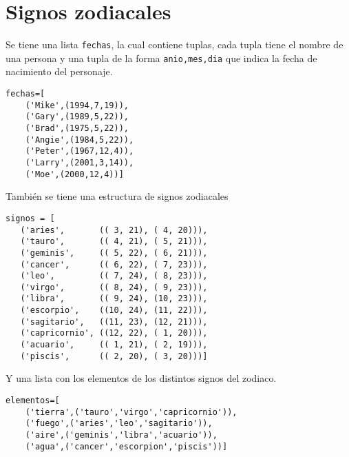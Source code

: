 \section{Signos zodiacales}
Se tiene una lista \texttt{fechas}, la cual contiene tuplas, cada tupla tiene el nombre de una persona y una tupla de la forma \texttt{anio,mes,dia} que indica la fecha de nacimiento del personaje.

\begin{lstlisting}[style=consola]
fechas=[
    ('Mike',(1994,7,19)),
    ('Gary',(1989,5,22)),
    ('Brad',(1975,5,22)),
    ('Angie',(1984,5,22)),
    ('Peter',(1967,12,4)),
    ('Larry',(2001,3,14)),
    ('Moe',(2000,12,4))]
\end{lstlisting}

También se tiene una estructura de signos zodiacales

\begin{lstlisting}[style=consola]
signos = [
   ('aries',       (( 3, 21), ( 4, 20))),
   ('tauro',       (( 4, 21), ( 5, 21))),
   ('geminis',     (( 5, 22), ( 6, 21))), 
   ('cancer',      (( 6, 22), ( 7, 23))),
   ('leo',         (( 7, 24), ( 8, 23))),  
   ('virgo',       (( 8, 24), ( 9, 23))),
   ('libra',       (( 9, 24), (10, 23))), 
   ('escorpio',    ((10, 24), (11, 22))),
   ('sagitario',   ((11, 23), (12, 21))),  
   ('capricornio', ((12, 22), ( 1, 20))),
   ('acuario',     (( 1, 21), ( 2, 19))),  
   ('piscis',      (( 2, 20), ( 3, 20)))]
\end{lstlisting}

Y una lista con los elementos de los distintos signos del zodiaco.
\begin{lstlisting}[style=consola]
elementos=[
    ('tierra',('tauro','virgo','capricornio')),
    ('fuego',('aries','leo','sagitario')),
    ('aire',('geminis','libra','acuario')),
    ('agua',('cancer','escorpion','piscis'))]
\end{lstlisting}

